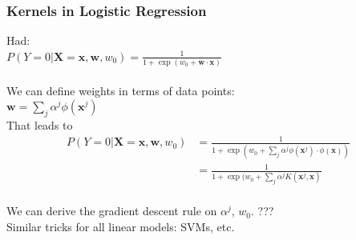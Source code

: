 \subsubsection{Kernels in Logistic Regression}
Had: \hfill \\
$P(Y=0 | \bm{X}= \bm{x}, \bm{w}, w_0 )= \frac{1}{1 + \exp(w_0 + \bm{w}\cdot \bm{x})}$ \hfill \\
 \hfill \\

We can define weights in terms of data points: \hfill \\
$\displaystyle  \bm{w} = \sum_j \alpha^j \phi(\bm{x}^j)$  \hfill \\
That leads to 
\begin{align*}
	P(Y=0 | \bm{X}= \bm{x}, \bm{w}, w_0 ) &= \frac{1}{1 + \exp(w_0 +  \sum_j  \alpha^j \phi(\bm{x}^j) \cdot \phi(\bm{x}))} \\
		& = \frac{1}{1 + \exp(w_0 +  \sum_j  \alpha^j K(\bm{x}^j , \bm{x})} \\
\end{align*}

We can derive the gradient descent rule on $\alpha^j$, $w_0$.  ???  \hfill \\

Similar tricks for all linear models: SVMs, etc. 


